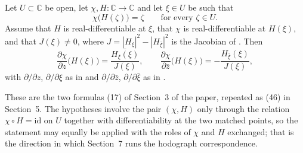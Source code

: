 \begin{lemma}
Let $U\subset\mathbb{C}$ be open, let $\chi,H\colon\mathbb{C}\to\mathbb{C}$ and
let $\xi\in U$ be such that
\[
  \chi\bigl(H(\zeta)\bigr)=\zeta\qquad\text{for every }\zeta\in U .
\]
Assume that $H$ is real-differentiable at $\xi$, that $\chi$ is
real-differentiable at $H(\xi)$, and that $J(\xi)\neq0$, where
$J=|H_\xi|^2-|H_{\bar\xi}|^2$ is the Jacobian of .  Then
\[
  \frac{\partial\chi}{\partial z}\bigl(H(\xi)\bigr)
  =\frac{\overline{H_\xi(\xi)}}{J(\xi)},
  \qquad
  \frac{\partial\chi}{\partial\bar z}\bigl(H(\xi)\bigr)
  =-\frac{H_{\bar\xi}(\xi)}{J(\xi)},
\]
with $\partial/\partial z$, $\partial/\partial\xi$ as in  and
$\partial/\partial\bar z$, $\partial/\partial\bar\xi$ as in .

These are the two formulas (17) of Section~3 of the paper, repeated as (46) in
Section~5.  The hypotheses involve the pair $(\chi,H)$ only through the
relation $\chi\circ H=\mathrm{id}$ on $U$ together with differentiability at
the two matched points, so the statement may equally be applied with the roles
of $\chi$ and $H$ exchanged; that is the direction in which Section~7 runs the
hodograph correspondence.
\end{lemma}
